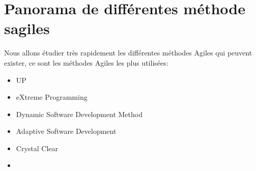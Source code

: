 		
	\section{Panorama de différentes méthode sagiles}
	Nous allons étudier très rapidement les différentes méthodes Agiles qui peuvent exister, ce sont les méthodes Agiles les plus utilisées: 
	\begin{itemize}
		\item UP
		\item eXtreme Programming
		\item Dynamic Software Development Method
		\item Adaptive Software Development
		\item Crystal Clear
		\item {}
	\end{itemize}
